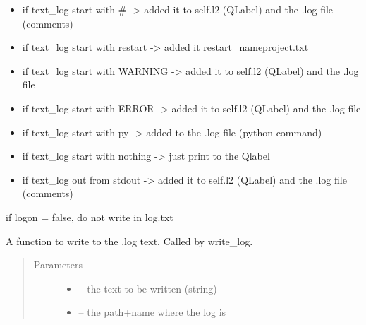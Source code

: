 \documentclass[letterpaper,10pt,english]{sphinxmanual}
\begin{document}
\begin{fulllineitems}
\begin{fulllineitems}
\begin{quote}
\begin{description}
\end{description}\end{quote}
\begin{itemize}
\item {} 
if text\_log start with \# -\textgreater{} added it to self.l2 (QLabel) and the .log file (comments)

\item {} 
if text\_log start with restart -\textgreater{} added it restart\_nameproject.txt

\item {} 
if text\_log start with WARNING -\textgreater{} added it to self.l2 (QLabel) and the .log file

\item {} 
if text\_log start with ERROR -\textgreater{} added it to self.l2 (QLabel) and the .log file

\item {} 
if text\_log start with py -\textgreater{} added to the .log file (python command)

\item {} 
if text\_log start with nothing -\textgreater{} just print to the Qlabel

\item {} 
if text\_log out from stdout -\textgreater{} added it to self.l2 (QLabel) and the .log file (comments)

\end{itemize}

if logon = false, do not write in log.txt

\end{fulllineitems}


\begin{fulllineitems}
\label{\detokenize{index:src_GUI.Main_windows_1.CentralW.write_log_file}}
A function to write to the .log text. Called by write\_log.
\begin{quote}\begin{description}
\item[{Parameters}] \leavevmode\begin{itemize}
\item {} 
 -- the text to be written (string)

\item {} 
 -- the path+name where the log is

\end{itemize}

\end{description}\end{quote}

\end{fulllineitems}


\end{fulllineitems}
\end{document}
